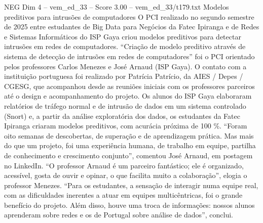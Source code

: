 \begin{textsample}{NEG Dim 4 – vem\_ed\_33 – Score 3.00 – vem\_ed\_33/t179.txt}  \label{ex:f4_neg_043}
Modelos preditivos para intrusões de computadores O PCI realizado no segundo semestre de 2025 entre estudantes de Big Data para Negócios da Fatec Ipiranga e de Redes e Sistemas Informáticos do ISP Gaya criou modelos preditivos para detectar intrusões em redes de computadores. “Criação de modelo preditivo através de sistema de detecção de intrusões em redes de computadores” foi o PCI orientado pelos professores Carlos Menezes e José Arnaud (ISP Gaya).
O contato com a instituição portuguesa foi realizado por Patrícia Patrício, da AIES / Depes / CGESG, que acompanhou desde as reuniões iniciais com os professores parceiros até o design e acompanhamento do projeto.
Os alunos do ISP Gaya elaboraram relatórios de tráfego normal e de intrusão de dados em um sistema controlado (Snort) e, a partir da análise exploratória dos dados, os estudantes da Fatec Ipiranga criaram modelos preditivos, com acurácia próxima de 100 \%. “Foram oito semanas de descobertas, de superação e de aprendizagem prática.
Mas mais do que um projeto, foi uma experiência humana, de trabalho em equipe, partilha de conhecimento e crescimento conjunto”, comentou José Arnaud, em postagem no LinkedIn. “O professor Arnaud é um parceiro fantástico; ele é organizado, acessível, gosta de ouvir e opinar, o que facilita muito a colaboração”, elogia o professor Menezes. “Para os estudantes, a sensação de interagir numa equipe real, com as dificuldades inerentes a atuar em equipes multicêntricas, foi o grande benefício do projeto.
Além disso, houve uma troca de informações: nossos alunos aprenderam sobre redes e os de Portugal sobre análise de dados”, conclui.

\end{textsample}
